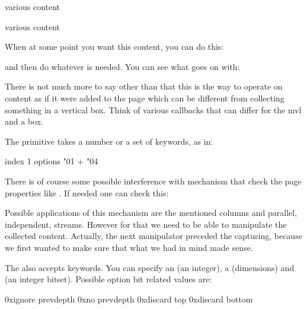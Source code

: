 \starttyping[option=TEX]
various content
\endmvl

various content
\endmvl
\stoptyping

When at some point you want this content, you can do this:

\starttyping[option=TEX]
\setbox\scratchboxone{}
\setbox\scratchboxtwo{}
\stoptyping

and then do whatever is needed. You can see what goes on with:

\starttyping[option=TEX]
\stoptyping

There is not much more to say other than that this is the way to operate on
content as if it were added to the page which can be different from collecting
something in a vertical box. Think of various callbacks that can differ for the
mvl and a box.

The \type {\beginmvl} primitive takes a number or a set of keywords, as in:

\starttyping[option=TEX]
\beginmvl
    index   1
    options \numexpr "01 + "04\relax
\relax
\stoptyping

There is of course some possible interference with mechanism that check the page
properties like \type {\pagegoal}. If needed one can check this:

\starttyping[option=TEX]
\ifcase\mvlcurrentlyactive
\or
\else
\fi
\stoptyping

Possible applications of this mechanism are the mentioned columns and parallel,
independent, streams. However for that we need to be able to manipulate the
collected content. Actually, the next manipulator preceded the capturing, because
we first wanted to make sure that what we had in mind made sense.

The  also accepts keywords. You can specify an  (an
integer), a  (dimensions) and  (an integer
bitset). Possible option bit related values are:

\starttabulate[|Tr|||]
\NC 0x\tohexadecimal\ignoreprevdepthmvloptioncode \NC ignore prevdepth \NC \type {\ignoreprevdepthmvloptioncode} \NC \NR
\NC 0x\tohexadecimal\noprevdepthmvloptioncode     \NC no prevdepth     \NC \type {\noprevdepthmvloptioncode    } \NC \NR
\NC 0x\tohexadecimal\discardtopmvloptioncode      \NC discard top      \NC \type {\discardtopmvloptioncode     } \NC \NR
\NC 0x\tohexadecimal\discardbottommvloptioncode   \NC discard bottom   \NC \type {\discardbottommvloptioncode  } \NC \NR
\stoptabulate

